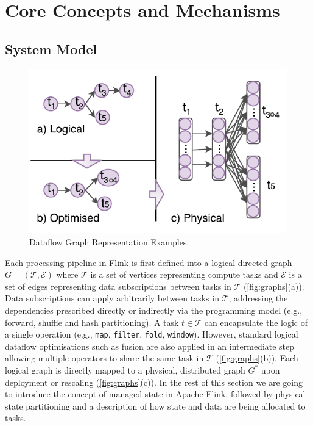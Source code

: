 
\section{Core Concepts and Mechanisms}
\label{sec:core}

\subsection{System Model}

\begin{figure}[h]
\centering
\includegraphics[width=\textwidth / 2]{figures/graphs.pdf}
\vspace*{-5mm}
\caption{Dataflow Graph Representation Examples.} 
\label{fig:graphs}
\vspace{-4mm}
\end{figure}

Each processing pipeline in Flink is first defined into a logical directed graph $G = (\mathcal{T}, \mathcal{E})$ where $\mathcal{T}$ is a set of vertices representing compute tasks and $\mathcal{E}$ is a set of edges representing data subscriptions between tasks in $\mathcal{T}$ (\autoref{fig:graphs}(a)). Data subscriptions can apply arbitrarily between tasks in $\mathcal{T}$, addressing the dependencies prescribed directly or indirectly via the programming model (e.g., forward, shuffle and hash partitioning). A task $t \in \mathcal{T}$ can encapsulate the logic of a single operation (e.g., \texttt{map}, \texttt{filter}, \texttt{fold}, \texttt{window}). However, standard logical dataflow optimisations  such as fusion \cite{hirzel2014catalog,chambers2010flumejava} are also applied in an intermediate step allowing multiple operators to share the same task in $\mathcal{T}$ (\autoref{fig:graphs}(b)). Each logical graph is directly mapped to a physical, distributed graph $G^*$ upon deployment or rescaling (\autoref{fig:graphs}(c)). In the rest of this section we are going to introduce the concept of managed state in Apache Flink, followed by physical state partitioning and a description of how state and data are being allocated to tasks.

